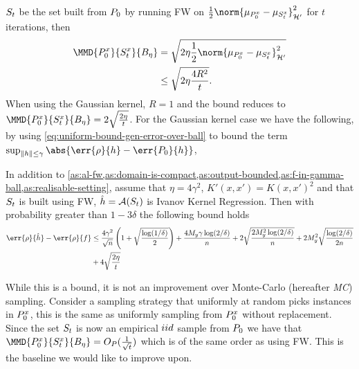 \(S_{t}\) be the set built from \(P_{0}\) by running FW on
\(\frac{1}{2}\norm{\mu_{\poolsetx_0} - \mu_{\trainsetx_{t}}}_{\rkhs{H}'}^2\) for
\(t\) iterations, then
\begin{align*}
  \label{align:fw-worst-bound-on-mmd}
  \MMD{\poolsetx_{0}}{\trainsetx_{t}}{B_{\eta}} & = \sqrt{2\eta\frac{1}{2}\norm{\mu_{\poolsetx_0} - \mu_{\trainsetx_{t}}}_{\rkhs{H}'}^2} \\
                                                & \leq \sqrt{2\eta \frac{4R^2}{t}}.
\end{align*}
When using the Gaussian kernel, \(R = 1\) and the bound reduces to
\(\MMD{\poolsetx_{0}}{\trainsetx_{t}}{B_{\eta}} = 2\sqrt{\frac{2\eta}{t}}\). For
the Gaussian kernel case we have the following, by using
\ref{eq:uniform-bound-gen-error-over-ball} to bound the term \(\sup_{\|h\| \leq \gamma}\abs{\err{\rho}{h} - \err{\poolset_0}{h}}\),
\begin{theorem}
  \label{al:worst-fw-generalisation-bound-no-additional-assumptions}
  In addition to \cref{as:al-fw,as:domain-is-compact,as:output-bounded,as:f-in-gamma-ball,as:realisable-setting}, assume that \(\eta = 4\gamma^{2}\), \(K'(x, x') = K(x,
  x')^{2}\) and that \(S_t\) is built using FW, \(\hat{h} = \mathcal{A}(S_t)\) is Ivanov
  Kernel Regression. Then with probability greater than \(1 - 3\delta\) the following bound holds
  \begin{align*}
    \err{\rho}{\hat{h}} - \err{\rho}{f} & \leq \frac{4 \gamma^2}{\sqrt{n}}\left(1 + \sqrt{\frac{\log(1/\delta)}{2}} \right) + \frac{4 M_y \gamma \log(2/\delta)}{n} + 2\sqrt{\frac{2 M_y^2 \log(2/\delta)}{n}} + 2M_y^2\sqrt{\frac{\log(2/\delta)}{2n}} \\
                                        & + 4\sqrt{\frac{2\eta}{t}}
  \end{align*}
\end{theorem}

While this is a bound, it is not an improvement over Monte-Carlo (hereafter \textit{MC}) sampling.
Consider a sampling strategy that uniformly at random picks instances in
\(P^x_0\), this is the same as uniformly sampling from
\(P^x_0\) without replacement. Since the set \(S_{t}\) is now an
empirical \(iid\) sample from \(P_{0}\) we have that
\(\MMD{\poolsetx_{0}}{\trainsetx_{t}}{B_{\eta}} = O_{P}(\frac{1}{\sqrt{t}})\)
\cite{tolstikhin17_minim_estim_kernel_mean_embed} which is of the same order as
using FW. This is the baseline we would like to improve upon.


